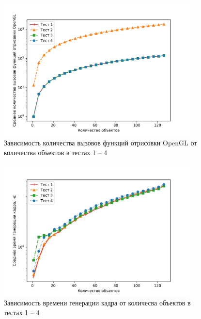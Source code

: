 \begin{figure}[H]
	\centering
    \includegraphics[width=0.9\textwidth]{img/1234/plot_draw_calls.pdf}
	\caption{Зависимость количества вызовов функций отрисовки OpenGL от количества объектов в тестах 1 -- 4}
	\label{fig:1234:dc}
\end{figure}

\begin{figure}[H]
	\centering
    \includegraphics[width=0.9\textwidth]{img/1234/plot_time.pdf}
	\caption{Зависимость времени генерации кадра от количесва объектов в тестах 1 -- 4}
	\label{fig:1234:time}
\end{figure}

